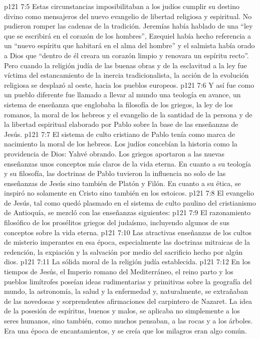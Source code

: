 \vs p121 7:5 Estas circunstancias imposibilitaban a los judíos cumplir su destino divino como mensajeros del nuevo evangelio de libertad religiosa y espiritual. No pudieron romper las cadenas de la tradición. Jeremías había hablado de una “ley que se escribirá en el corazón de los hombres”, Ezequiel había hecho referencia a un “nuevo espíritu que habitará en el alma del hombre” y el salmista había orado a Dios que “dentro de él creara un corazón limpio y renovara un espíritu recto”. Pero cuando la religión judía de las buenas obras y de la esclavitud a la ley fue víctima del estancamiento de la inercia tradicionalista, la acción de la evolución religiosa se desplazó al oeste, hacia los pueblos europeos.
\vs p121 7:6 Y así fue como un pueblo diferente fue llamado a llevar al mundo una teología en avance, un sistema de enseñanza que englobaba la filosofía de los griegos, la ley de los romanos, la moral de los hebreos y el evangelio de la santidad de la persona y de la libertad espiritual elaborado por Pablo sobre la base de las enseñanzas de Jesús.
\vs p121 7:7 \pc El sistema de culto cristiano de Pablo tenía como marca de nacimiento la moral de los hebreos. Los judíos concebían la historia como la providencia de Dios: Yahvé obrando. Los griegos aportaron a las nuevas enseñanzas unos conceptos más claros de la vida eterna. En cuanto a su teología y su filosofía, las doctrinas de Pablo tuvieron la influencia no solo de las enseñanzas de Jesús sino también de Platón y Filón. En cuanto a su ética, se inspiró no solamente en Cristo sino también en los estoicos.
\vs p121 7:8 El evangelio de Jesús, tal como quedó plasmado en el sistema de culto paulino del cristianismo de Antioquía, se mezcló con las enseñanzas siguientes:
\vs p121 7:9 El razonamiento filosófico de los prosélitos griegos del judaísmo, incluyendo algunos de sus conceptos sobre la vida eterna.
\vs p121 7:10 Las atractivas enseñanzas de los cultos de misterio imperantes en esa época, especialmente las doctrinas mitraicas de la redención, la expiación y la salvación por medio del sacrificio hecho por algún dios.
\vs p121 7:11 La sólida moral de la religión judía establecida.
\vs p121 7:12 \pc En los tiempos de Jesús, el Imperio romano del Mediterráneo, el reino parto y los pueblos limítrofes poseían ideas rudimentarias y primitivas sobre la geografía del mundo, la astronomía, la salud y la enfermedad y, naturalmente, se extrañaban de las novedosas y sorprendentes afirmaciones del carpintero de Nazaret. La idea de la posesión de espíritus, buenos y malos, se aplicaba no simplemente a los seres humanos, sino también, como muchos pensaban, a las rocas y a los árboles. Era una época de encantamientos, y se creía que los milagros eran algo común.

